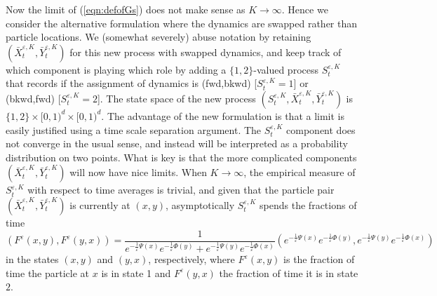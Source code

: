 \documentclass[english,11pt]{article}%
\numberwithin{equation}{section}
\numberwithin{example}{section}
\numberwithin{theorem}{section}
\begin{document}
Now the limit of (\ref{eqn:defofGs}) does not make sense as $K\rightarrow
\infty$. Hence we consider the alternative formulation where the dynamics are
swapped rather than particle locations. We (somewhat severely) abuse notation
by retaining $(\bar{X}_{t}^{\varepsilon,K},\bar{Y}_{t}^{\varepsilon,K})$ for
this new process with swapped dynamics, and keep track of which component is
playing which role by adding a $\{1,2\}$-valued process $S_{t}^{\varepsilon
,K}$ that records if the assignment of dynamics is (fwd,bkwd) [$S_{t}%
^{\varepsilon,K}=1$] or (bkwd,fwd) [$S_{t}^{\varepsilon,K}=2$]. The state
space of the new process $(S_{t}^{\varepsilon,K},\bar{X}_{t}^{\varepsilon
,K},\bar{Y}_{t}^{\varepsilon,K})$ is $\{1,2\}\times\lbrack0,1)^{d}%
\times\lbrack0,1)^{d}$. The advantage of the new formulation is that a limit
is easily justified using a time scale separation argument. The $S_{t}%
^{\varepsilon,K}$ component does not converge in the usual sense, and instead
will be interpreted as a probability distribution on two points. What is key
is that the more complicated components $(\bar{X}_{t}^{\varepsilon,K},\bar
{Y}_{t}^{\varepsilon,K})$ will now have nice limits. When $K\rightarrow\infty
$, the empirical measure of $S_{t}^{\varepsilon,K}$ with respect to time
averages is trivial, and given that the particle pair $(\bar{X}_{t}%
^{\varepsilon,K},\bar{Y}_{t}^{\varepsilon,K})$ is currently at $(x,y)$,
asymptotically $S_{t}^{\varepsilon,K}$ spends the fractions of time
\begin{equation}
(F^{\varepsilon}(x,y),F^{\varepsilon}(y,x))=\frac{1}{e^{-\frac{1}{\varepsilon
}\Psi(x)}e^{-\frac{1}{\varepsilon}\Phi(y)}+e^{-\frac{1}{\varepsilon}\Psi
(y)}e^{-\frac{1}{\varepsilon}\Phi(x)}}\left(  e^{-\frac{1}{\varepsilon}%
\Psi(x)}e^{-\frac{1}{\varepsilon}\Phi(y)},e^{-\frac{1}{\varepsilon}\Psi
(y)}e^{-\frac{1}{\varepsilon}\Phi(x)}\right)  \label{eqn:defofF}%
\end{equation}
in the states $(x,y)$ and $(y,x)$, respectively, where $F^{\varepsilon}(x,y)$
is the fraction of time the particle at $x$ is in state 1 and $F^{\varepsilon
}(y,x)$ the fraction of time it is in state $2$.
\end{document}
